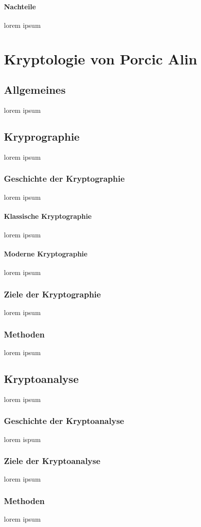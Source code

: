 \documentclass[10pt,a4paper]{report}
\begin{document}
\paragraph{Nachteile}
lorem ipsum
\section{Kryptologie von Porcic Alin}
\subsection{Allgemeines}
lorem ipsum
\subsection{Kryprographie}
lorem ipsum
\subsubsection{Geschichte der Kryptographie}
lorem ipsum
\paragraph{Klassische Kryptographie}
lorem ipsum
\paragraph{Moderne Kryptographie}
lorem ipsum
\subsubsection{Ziele der Kryptographie}
lorem ipsum
\subsubsection{Methoden}
lorem ipsum
\subsection{Kryptoanalyse}
lorem ipsum
\subsubsection{Geschichte der Kryptoanalyse}
lorem ispum
\subsubsection{Ziele der Kryptoanalyse}
lorem ipsum
\subsubsection{Methoden}
lorem ipsum
\end{document}
